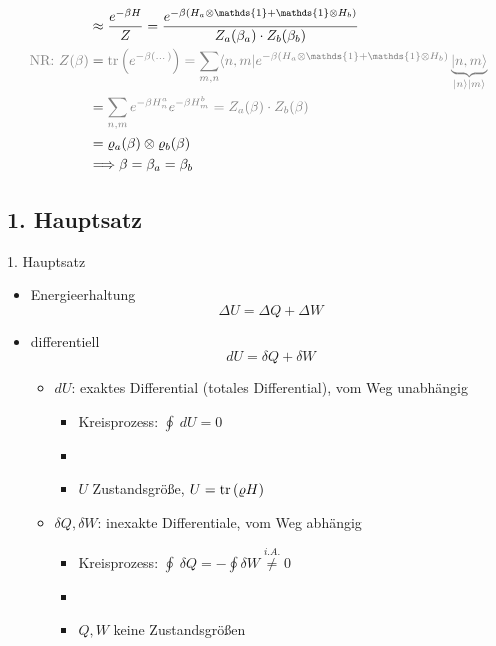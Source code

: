 \begin{itemize}
\begin{align}
        &\approx \frac{e^{-\beta H}}{Z} = \frac{e^{-\beta\left(H_a \otimes \mathds{1} + \mathds{1} \otimes H_b\right)}}{Z_a(\beta_a)\cdot Z_b(\beta_b)} \\
        \color{black!50} \text{NR: } Z(\beta) &= \color{black!50} \trace\left(e^{-\beta(\dots)}\right) = \sum_{m,n} \langle n,m| e^{-\beta(H_a \otimes \mathds{1} + \mathds{1} \otimes H_b )} \underbrace{|n,m\rangle}_{\ket{n}\ket{m}}\\
        \color{black!50} &= \color{black!50} \sum_{n,m} e^{-\beta H_n^a} e^{-\beta H_m^b} = Z_a(\beta) \cdot Z_b(\beta) \\
        &= \varrho_a(\beta) \otimes \varrho_b(\beta) \\
        &\Longrightarrow \beta = \beta_a = \beta_b
    \end{align}
\end{itemize}

\subsection{1. Hauptsatz}
\begin{definition}{1. Hauptsatz}
    \begin{itemize}
        \item[] Energieerhaltung
        \begin{equation}
            \Delta U = \Delta Q + \Delta W
        \end{equation}
        \item[] differentiell
        \begin{equation}
            dU = \delta Q + \delta W
        \end{equation}
        \begin{itemize}
            \item[]$dU$: exaktes Differential (totales Differential), vom Weg unabhängig
            \begin{itemize}
                \item[] Kreisprozess: $\oint \ dU = 0$
                \item[]
                \item[] $U$ Zustandsgröße, $U = \trace\left(\varrho H \right)$
            \end{itemize}
            \item[]$\delta Q, \delta W$: inexakte Differentiale, vom Weg abhängig
            \begin{itemize}
                \item[] Kreisprozess: $\oint \ \delta Q = -\oint \delta W \stackrel{i.A.}{\neq} 0$
                \item[]
                \item[] $Q,W$ keine Zustandsgrößen
            \end{itemize}
        \end{itemize}
    \end{itemize}
\end{definition}

